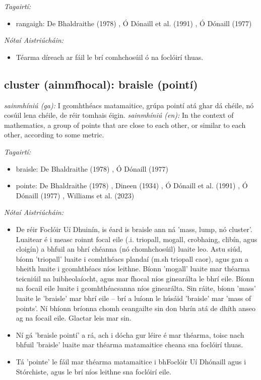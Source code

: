 \documentclass{article}
\begin{document}
 \noindent \textit{Tagairtí:}
\begin{itemize}
	\item rangaigh: De Bhaldraithe (1978) \cite{de-bhaldraithe}, Ó Dónaill et al. (1991) \cite{focloir-beag}, Ó Dónaill (1977) \cite{odonaill}
\end{itemize}

 \noindent \textit{Nótaí Aistriúcháin:}
\begin{itemize}
	\item Téarma díreach ar fáil le brí comhchosúil ó na foclóirí thuas.
\end{itemize}


\subsection*{cluster (ainmfhocal): braisle (pointí)} 
 \noindent \textit{sainmhíniú (ga):} I gcomhthéacs matamaitice, grúpa pointí atá ghar dá chéile, nó cosúil lena chéile, de réir tomhais éigin.
\newline\newline
 \noindent \textit{sainmhíniú (en):} In the context of mathematics, a group of points that are close to each other, or similar to each other, according to some metric.
\newline

 \noindent \textit{Tagairtí:}
\begin{itemize}
	\item braisle: De Bhaldraithe (1978) \cite{de-bhaldraithe}, Ó Dónaill (1977) \cite{odonaill}
	\item pointe: De Bhaldraithe (1978) \cite{de-bhaldraithe}, Dineen (1934) \cite{dineen}, Ó Dónaill et al. (1991) \cite{focloir-beag}, Ó Dónaill (1977) \cite{odonaill}, Williams et al. (2023) \cite{storchiste}
\end{itemize}

 \noindent \textit{Nótaí Aistriúcháin:}
\begin{itemize}
	\item De réir Foclóir Uí Dhuinín, is éard is braisle ann ná 'mass, lump, nó cluster'. Luaitear é i measc roinnt focal eile (.i. triopall, mogall, crobhaing, clibín, agus cloigín) a bhfuil an bhrí chéanna (nó chomhchosúil) luaite leo. Astu siúd, bíonn 'triopall' luaite i comhthéacs plandaí (m.sh triopall caor), agus gan a bheith luaite i gcomhthéacs níos leithne. Bíonn 'mogall' luaite mar théarma teicniúil na luibheolaíocht, agus mar fhocal níos ginearálta le bhrí eile. Bíonn na focail eile luaite i gcomhthéacsanna níos ginearálta. Sin ráite, bíonn 'mass' luaite le 'braisle' mar bhrí eile -- brí a luíonn le húsáid 'braisle' mar 'mass of points'. Ní bhíonn bríonna chomh ceangailte sin don bhrín atá de dhíth anseo ag na focail eile. Glactar leis mar sin.
	\item Ní gá 'braisle pointí' a rá, ach i dócha gur léire é mar théarma, toisc nach bhfuil 'braisle' luaite mar théarma matamaitice cheana sna foclóirí thuas.
	\item Tá 'pointe' le fáil mar théarma matamaitice i bhFoclóir Uí Dhónaill agus i Stórchiste, agus le brí níos leithne sna foclóirí eile.
\end{itemize}
\end{document}
